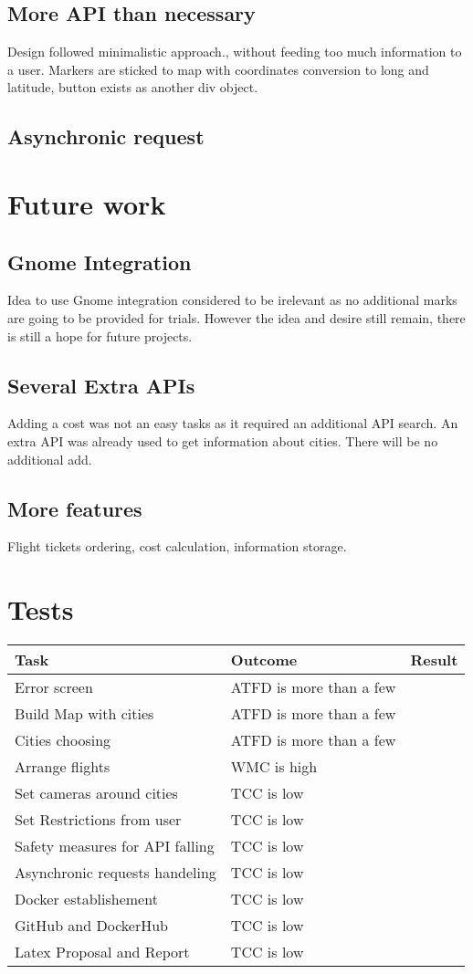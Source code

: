 \documentclass[12pt]{article}
\numberwithin{equation}{section} %
\numberwithin{figure}{section} %
\numberwithin{table}{section} %
\begin{document}
	\subsection{More API than necessary}
		Design followed minimalistic approach., without feeding too much information to a user. Markers are sticked to map with coordinates conversion to long and latitude, button exists as another div object. \\
	\subsection{Asynchronic request}
\section{Future work}
	\subsection{Gnome Integration}
		Idea to use Gnome integration considered to be irelevant as no additional marks are going to be provided for trials. However the idea and desire still remain, there is still a hope for future projects.
	\subsection{Several Extra APIs}
		Adding a cost was not an easy tasks as it required an additional API search. An extra API was already used to get information about cities. There will be no additional add.
	\subsection{More features}
		Flight tickets ordering, cost calculation, information storage.

\section{Tests}	
	\begin{tabularx}{\textwidth}{X|l|l}
		\textbf{Task} & \textbf{Outcome} & Result \\
		\hline
		Error screen & ATFD is more than a few & \\
		\hline
		Build Map with cities & ATFD is more than a few & \\
		\hline
		Cities choosing & ATFD is more than a few & \\
		\hline
		Arrange flights & WMC is high & \\
		\hline
		Set cameras around cities & TCC is low & \\
		\hline
		Set Restrictions from user & TCC is low & \\
		\hline
		Safety measures for API falling & TCC is low & \\
		\hline
		Asynchronic requests handeling & TCC is low & \\
		\hline
		Docker establishement & TCC is low & \\
		\hline
		GitHub and DockerHub & TCC is low & \\
		\hline
		Latex Proposal and Report & TCC is low & \\
		\hline
	\end{tabularx}
	
\end{document}
